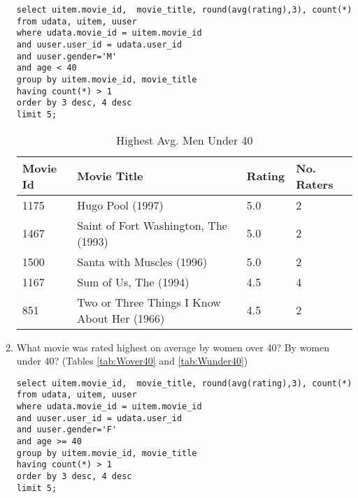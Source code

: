 \documentclass[letterpaper,11pt]{report}
\begin{document}
\begin{savenotes}
\begin{enumerate}
\begin{verbatim}
select uitem.movie_id,  movie_title, round(avg(rating),3), count(*) 
from udata, uitem, uuser 
where udata.movie_id = uitem.movie_id 
and uuser.user_id = udata.user_id 
and uuser.gender='M' 
and age < 40 
group by uitem.movie_id, movie_title 
having count(*) > 1 
order by 3 desc, 4 desc 
limit 5;
\end{verbatim}

\begin{table}[htbp]
\centering
    \begin{tabular}{|l|l|l|l|}
    \hline
    Movie Id & Movie Title                                 & Rating & No. Raters \\ \hline
    1175     & Hugo Pool (1997)                            & 5.0    & 2          \\ \hline
    1467     & Saint of Fort Washington, The (1993)        & 5.0    & 2          \\ \hline
    1500     & Santa with Muscles (1996)                   & 5.0    & 2          \\ \hline
    1167     & Sum of Us, The (1994)                       & 4.5    & 4          \\ \hline
    851      & Two or Three Things I Know About Her (1966) & 4.5    & 2          \\ \hline
    \end{tabular}
    \caption {Highest Avg. Men Under 40}
				\label{tab:Munder40}
\end{table}

\item What movie was rated highest on average by women over 40? By women under 40? (Tables \ref{tab:Wover40} and \ref{tab:Wunder40})
\begin{verbatim}
select uitem.movie_id,  movie_title, round(avg(rating),3), count(*) 
from udata, uitem, uuser 
where udata.movie_id = uitem.movie_id 
and uuser.user_id = udata.user_id 
and uuser.gender='F' 
and age >= 40 
group by uitem.movie_id, movie_title 
having count(*) > 1 
order by 3 desc, 4 desc 
limit 5;
\end{verbatim}



\end{enumerate}
\end{savenotes}
\end{document}
